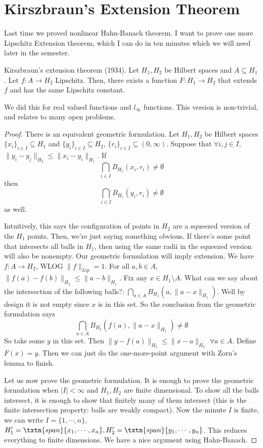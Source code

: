 \section{Kirszbraun's Extension Theorem}
Last time we proved nonlinear Hahn-Banach theorem. I want to prove one more Lipschitz Extension theorem, which I can do in ten minutes which we will need later in the semester. 

\begin{thm} Kirszbraun's extension theorem (1934). \label{thm:kirszbraun}
Let $H_1, H_2$ be Hilbert spaces and $A \subseteq H_1$. Let $f: A \to H_2$ Lipschitz. Then, there exists a function $F: H_1 \to H_2$ that extends $f$ and has the same Lipschitz constant.
\end{thm}
We did this for real valued functions and $l_{\infty}$ functions. This version is non-trivial, and relates to many open problems. 
\begin{proof}
There is an equivalent geometric formulation.
Let $H_1, H_2$ be Hilbert spaces $\{x_i\}_{i \in I} \subseteq H_1$ and $\{y_i\}_{i \in I} \subseteq H_2$, $\{r_i\}_{i \in I} \subseteq (0, \infty)$. Suppose that $\forall i, j \in I$, $\|y_i - y_j\|_{H_2} \leq \|x_i - y_i\|_{H_1}$. If 
\[
\bigcap_{i \in I} B_{H_1}(x_i, r_i) \neq \emptyset
\]
then 
\[
\bigcap_{i \in I} B_{H_1}(y_i, r_i) \neq \emptyset
\]
as well.

Intuitively, this says the configuration of points in $H_2$ are a squeezed version of the $H_1$ points. Then, we're just saying something obvious. If there's some point that intersects all balls in $H_1$, then using the same radii in the squeezed version will also be nonempty.
Our geometric formulation will imply extension. We have $f: A \to H_2$, WLOG $\|f\|_{Lip} = 1$. For all $a, b \in A$, $\|f(a) - f(b)\|_{H_2} \leq \|a - b\|_{H_1}$. Fix any $x \in H_1 \setminus A$. What can we say about the intersection of the following balls?: $\bigcap_{a \in A} B_{H_1}(a, \|a - x\|_{H_1})$. Well by design it is not empty since $x$ is in this set. So the conclusion from the geometric formulation says 
\[
\bigcap_{a \in A} B_{H_2}\left(f(a), \|a - x\|_{H_1}\right) \neq \emptyset
\]
So take some $y$ in this set. Then $\|y - f(a)\|_{H_2} \leq \|x - a\|_{H_2}$ $\forall a \in A$. 
Define $F(x) = y$. Then we can just do the one-more-point argument with Zorn's lemma to finish. 

Let us now prove the geometric formulation. It is enough to prove the geometric formulation when $|I| < \infty$ and $H_1, H_2$ are finite dimensional. 
To show all the balls intersect, it is enough to show that finitely many of them intersect (this is the finite intersection property: balls are weakly compact). 
Now the minute $I$ is finite, we can write $I = \{1, \cdots, n\}$, $H_1' = \txtn{span}\{x_1, \cdots, x_n\}, H_2' = \txtn{span}\{y_1, \cdots, y_n\}$. This reduces everything to finite dimensions. 
We have a nice argument using Hahn-Banach.
\end{proof}

